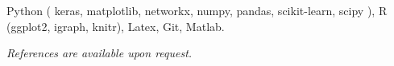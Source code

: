 \documentclass[
  date,
  number,
]{wgu-cv}
\begin{document}

Python (%
  keras,
  matplotlib,
  networkx,
  numpy,
  pandas,
  scikit-learn,
  scipy%
),
R (ggplot2, igraph, knitr),
Latex,
Git,
Matlab.



\emph{References are available upon request.}



\nobibliography*
\end{document}
